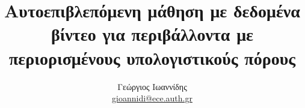 \documentclass[a4paper,12pt]{report}
\def\tl{\textlatin}
\begin{document}


\title{Αυτοεπιβλεπόμενη μάθηση με δεδομένα βίντεο για περιβάλλοντα με περιορισμένους  υπολογιστικούς πόρους}
\author{Γεώργιος Ιωαννίδης \\
\href{mailto:gioannidi@ece.auth.gr}{\tl{gioannidi@ece.auth.gr}}}
\maketitle

\tableofcontents
\thispagestyle{empty}









\appendix





\end{document}
